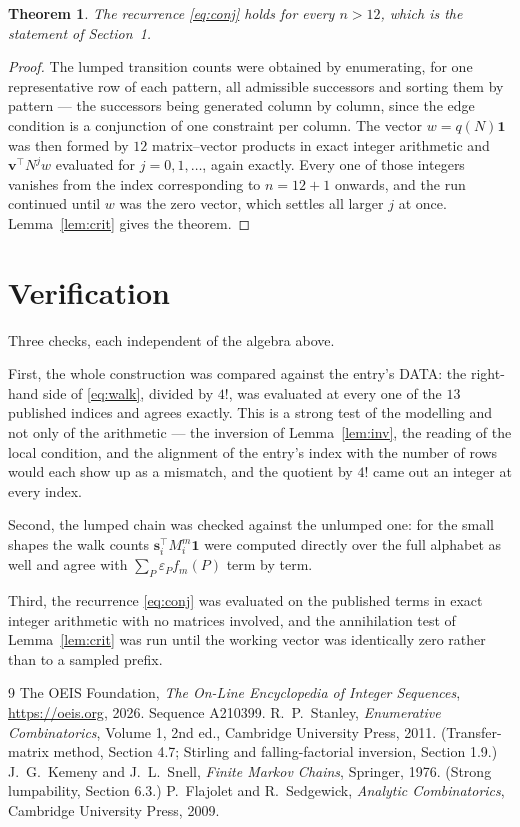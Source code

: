 \documentclass[11pt,a4paper]{article}
\theoremstyle{plain}
\newtheorem{theorem}{Theorem}
\theoremstyle{definition}
\begin{document}
\begin{theorem}
The recurrence \eqref{eq:conj} holds for every $n>12$, which is the statement of
Section~1.
\end{theorem}

\begin{proof}
The lumped transition counts were obtained by enumerating, for one representative row of
each pattern, all admissible successors and sorting them by pattern --- the successors being
generated column by column, since the edge condition is a conjunction of one constraint per
column. The vector $w=q(N)\mathbf{1}$ was then formed by $12$ matrix--vector products
in exact integer arithmetic and $\mathbf{v}^{\!\top}N^{j}w$ evaluated for
$j=0,1,\dots$, again exactly. Every one of those integers vanishes from the index
corresponding to $n=12+1$ onwards, and the run continued until $w$ was the zero vector,
which settles all larger $j$ at once. Lemma~\ref{lem:crit} gives the theorem.
\end{proof}

\section{Verification}

Three checks, each independent of the algebra above.

First, the whole construction was compared against the entry's DATA: the right-hand side of
\eqref{eq:walk}, divided by $4!$, was evaluated at every one of the $13$
published indices and agrees exactly. This is a strong test of the modelling and not only of
the arithmetic --- the inversion of Lemma~\ref{lem:inv}, the reading of the local
condition, and the alignment of the entry's index with the number of rows would each
show up as a mismatch, and the quotient by $4!$ came out an integer at every index.

Second, the lumped chain was checked against the unlumped one: for the small shapes the walk
counts $\mathbf{s}_i^{\!\top}M_i^{m}\mathbf{1}$ were computed directly over the full
alphabet as well and agree with $\sum_P\varepsilon_Pf_m(P)$ term by term.

Third, the recurrence \eqref{eq:conj} was evaluated on the published terms in exact integer
arithmetic with no matrices involved, and the annihilation test of Lemma~\ref{lem:crit} was
run until the working vector was identically zero rather than to a sampled prefix.

\begin{thebibliography}{9}
 The OEIS Foundation, \emph{The On-Line Encyclopedia of Integer
Sequences}, \url{https://oeis.org}, 2026. Sequence A210399.
 R.~P.~Stanley, \emph{Enumerative Combinatorics}, Volume 1, 2nd ed.,
Cambridge University Press, 2011. (Transfer-matrix method, Section 4.7; Stirling and
falling-factorial inversion, Section 1.9.)
 J.~G.~Kemeny and J.~L.~Snell, \emph{Finite Markov Chains}, Springer,
1976. (Strong lumpability, Section 6.3.)
 P.~Flajolet and R.~Sedgewick, \emph{Analytic Combinatorics}, Cambridge
University Press, 2009.
\end{thebibliography}
\end{document}
